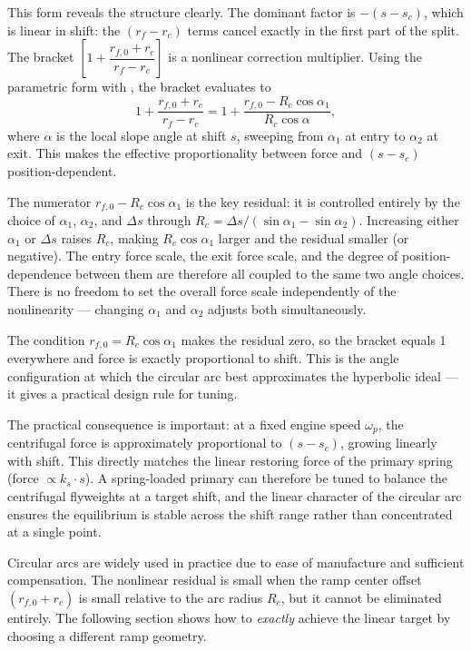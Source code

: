 \documentclass[11pt]{article}
\numberwithin{equation}{section}
\begin{document}
This form reveals the structure clearly. The dominant factor is $-(s - s_c)$,
which is linear in shift: the $(r_f - r_c)$ terms cancel exactly in the first
part of the split. The bracket $\left[1 + \dfrac{r_{f,0}+r_c}{r_f-r_c}\right]$
is a nonlinear correction multiplier. Using the parametric form
 with , the bracket evaluates to
\begin{equation}
1 + \frac{r_{f,0}+r_c}{r_f-r_c}
=
1 + \frac{r_{f,0} - R_c\cos\alpha_1}{R_c\cos\alpha},
\label{eq:circ_bracket}
\end{equation}
where $\alpha$ is the local slope angle at shift $s$, sweeping from $\alpha_1$
at entry to $\alpha_2$ at exit. This makes the effective proportionality between
force and $(s-s_c)$ position-dependent.

The numerator $r_{f,0} - R_c\cos\alpha_1$ is the key residual: it is
controlled entirely by the choice of $\alpha_1$, $\alpha_2$, and $\Delta s$
through $R_c = \Delta s/(\sin\alpha_1 - \sin\alpha_2)$. Increasing either $\alpha_1$
or $\Delta s$ raises $R_c$, making $R_c\cos\alpha_1$ larger and the residual
smaller (or negative). The entry force scale, the exit force scale, and the
degree of position-dependence between them are therefore all coupled to the
same two angle choices. There is no freedom to set the overall force scale
independently of the nonlinearity — changing $\alpha_1$ and $\alpha_2$ adjusts
both simultaneously.

The condition $r_{f,0} = R_c\cos\alpha_1$ makes the residual zero, so the
bracket equals 1 everywhere and force is exactly proportional to shift. This
is the angle configuration at which the circular arc best approximates the
hyperbolic ideal — it gives a practical design rule for tuning.

The practical consequence is important: at a fixed engine speed $\omega_p$,
the centrifugal force is approximately proportional to $(s - s_c)$, growing
linearly with shift. This directly matches the linear restoring force of the
primary spring (force $\propto k_s \cdot s$). A spring-loaded primary can
therefore be tuned to balance the centrifugal flyweights at a target shift,
and the linear character of the circular arc ensures the equilibrium is
stable across the shift range rather than concentrated at a single point.

Circular arcs are widely used in practice due to ease of manufacture and
sufficient compensation. The nonlinear residual is small when the ramp center
offset $(r_{f,0} + r_c)$ is small relative to the arc radius $R_c$, but it
cannot be eliminated entirely. The following section shows how to \emph{exactly}
achieve the linear target by choosing a different ramp geometry.
\end{document}
